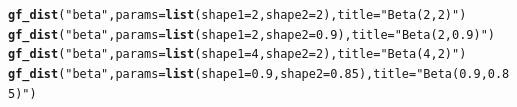 \documentclass[twoside]{book}\usepackage[]{graphicx}\usepackage[]{xcolor}
\makeatletter
\newcommand{\hlnum}[1]{\textcolor[rgb]{0.686,0.059,0.569}{#1}}%
\newcommand{\hlstr}[1]{\textcolor[rgb]{0.192,0.494,0.8}{#1}}%
\newcommand{\hlstd}[1]{\textcolor[rgb]{0.345,0.345,0.345}{#1}}%
\newcommand{\hlkwc}[1]{\textcolor[rgb]{0.333,0.667,0.333}{#1}}%
\newcommand{\hlkwd}[1]{\textcolor[rgb]{0.737,0.353,0.396}{\textbf{#1}}}%
\newenvironment{kframe}{%
 \def\at@end@of@kframe{}%
 \ifinner\ifhmode%
  \def\at@end@of@kframe{\end{minipage}}%
  \begin{minipage}{\columnwidth}%
 \fi\fi%
 \def\FrameCommand##1{\hskip\@totalleftmargin \hskip-\fboxsep
 \colorbox{shadecolor}{##1}\hskip-\fboxsep
     \hskip-\linewidth \hskip-\@totalleftmargin \hskip\columnwidth}%
 \MakeFramed {\advance\hsize-\width
   \@totalleftmargin\z@ \linewidth\hsize
   \@setminipage}}%
 {\par\unskip\endMakeFramed%
 \at@end@of@kframe}
\newenvironment{knitrout}{}{} %
\makeatother
\begin{document}
\begin{knitrout}
\color{fgcolor}\begin{kframe}
\begin{alltt}
\hlkwd{gf_dist}\hlstd{(}\hlstr{"beta"}\hlstd{,} \hlkwc{params} \hlstd{=} \hlkwd{list}\hlstd{(}\hlkwc{shape1} \hlstd{=} \hlnum{2}\hlstd{,} \hlkwc{shape2} \hlstd{=} \hlnum{2}\hlstd{),} \hlkwc{title} \hlstd{=} \hlstr{"Beta(2,2)"}\hlstd{)}
\hlkwd{gf_dist}\hlstd{(}\hlstr{"beta"}\hlstd{,} \hlkwc{params} \hlstd{=} \hlkwd{list}\hlstd{(}\hlkwc{shape1} \hlstd{=} \hlnum{2}\hlstd{,} \hlkwc{shape2} \hlstd{=} \hlnum{0.9}\hlstd{),} \hlkwc{title} \hlstd{=} \hlstr{"Beta(2,0.9)"}\hlstd{)}
\hlkwd{gf_dist}\hlstd{(}\hlstr{"beta"}\hlstd{,} \hlkwc{params} \hlstd{=} \hlkwd{list}\hlstd{(}\hlkwc{shape1} \hlstd{=} \hlnum{4}\hlstd{,} \hlkwc{shape2} \hlstd{=} \hlnum{2}\hlstd{),} \hlkwc{title} \hlstd{=} \hlstr{"Beta(4,2)"}\hlstd{)}
\hlkwd{gf_dist}\hlstd{(}\hlstr{"beta"}\hlstd{,} \hlkwc{params} \hlstd{=} \hlkwd{list}\hlstd{(}\hlkwc{shape1} \hlstd{=} \hlnum{0.9}\hlstd{,} \hlkwc{shape2} \hlstd{=} \hlnum{0.85}\hlstd{),} \hlkwc{title} \hlstd{=} \hlstr{"Beta(0.9,0.85)"}\hlstd{)}
\end{alltt}
\end{kframe}


\end{knitrout}
\end{document}
